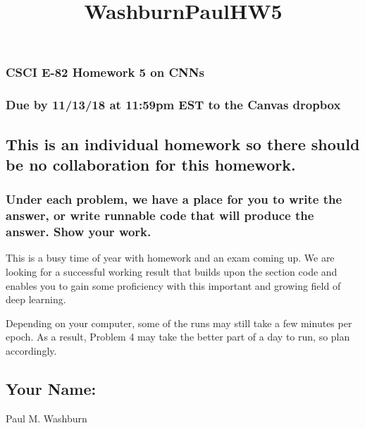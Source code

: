 \documentclass[11pt]{article}
\title{WashburnPaulHW5}
\begin{document}
    
    
    \maketitle
    
    

    
    \subsubsection{CSCI E-82 Homework 5 on
CNNs}\label{csci-e-82-homework-5-on-cnns}

\subsubsection{Due by 11/13/18 at 11:59pm EST to the Canvas
dropbox}\label{due-by-111318-at-1159pm-est-to-the-canvas-dropbox}

\subsection{This is an individual homework so there should be no
collaboration for this
homework.}\label{this-is-an-individual-homework-so-there-should-be-no-collaboration-for-this-homework.}

\subsubsection{Under each problem, we have a place for you to write the
answer, or write runnable code that will produce the answer. Show your
work.}\label{under-each-problem-we-have-a-place-for-you-to-write-the-answer-or-write-runnable-code-that-will-produce-the-answer.-show-your-work.}

    This is a busy time of year with homework and an exam coming up. We are
looking for a successful working result that builds upon the section
code and enables you to gain some proficiency with this important and
growing field of deep learning.

Depending on your computer, some of the runs may still take a few
minutes per epoch. As a result, Problem 4 may take the better part of a
day to run, so plan accordingly.

    \subsection{Your Name:}\label{your-name}

    Paul M. Washburn
\end{document}
